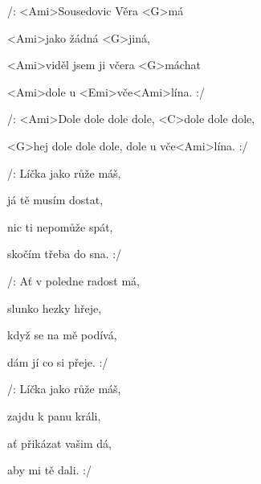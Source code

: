 

\zs
/: <Ami>Sousedovic Věra <G>má

<Ami>jako žádná <G>jiná,

<Ami>viděl jsem ji včera <G>máchat

<Ami>dole u <Emi>vče<Ami>lína. :/
\ks

\zr
/: <Ami>Dole dole dole dole, <C>dole dole dole,

<G>hej dole dole dole, dole u vče<Ami>lína. :/
\kr

\zs
/: Líčka jako růže máš,

já tě musím dostat,

nic ti nepomůže spát,

skočím třeba do sna. :/
\ks

\zr \kr

\zs
/: Ať v poledne radost má,

slunko hezky hřeje,

když se na mě podívá,

dám jí co si přeje. :/
\ks

\zr \kr

\zs
/: Líčka jako růže máš,

zajdu k panu králi,

ať přikázat vašim dá,

aby mi tě dali. :/
\ks

\zr \kr

\kp

























